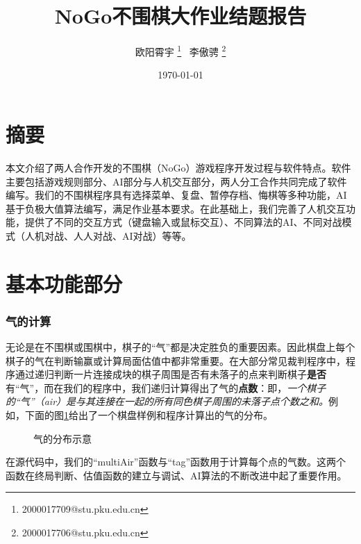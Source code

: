 \documentclass[twocolumn]{article}
\title{\bf NoGo不围棋大作业结题报告}
\author{欧阳霄宇 \thanks{2000017709@stu.pku.edu.cn} \ 李傲骋 \thanks{2000017706@stu.pku.edu.cn}}
\date{\today}
\begin{document}
\maketitle{}
\tableofcontents
\newpage
\part{摘要}
本文介绍了两人合作开发的不围棋（NoGo）游戏程序开发过程与软件特点。软件主要包括游戏规则部分、AI部分与人机交互部分，两人分工合作共同完成了软件编写。我们的不围棋程序具有选择菜单、复盘、暂停存档、悔棋等多种功能，AI基于负极大值算法编写，满足作业基本要求。在此基础上，我们完善了人机交互功能，提供了不同的交互方式（键盘输入或鼠标交互）、不同算法的AI、不同对战模式（人机对战、人人对战、AI对战）等等。
\part{基本功能部分}
\section{气的计算}
无论是在不围棋或围棋中，棋子的“气”都是决定胜负的重要因素。因此棋盘上每个棋子的气在判断输赢或计算局面估值中都非常重要。在大部分常见裁判程序中，程序通过递归判断一片连接成块的棋子周围是否有未落子的点来判断棋子{\bf 是否}有“气”，而在我们的程序中，我们递归计算得出了气的{\bf 点数}：即，{\it 一个棋子的“气”（air）是与其连接在一起的所有同色棋子周围的未落子点个数之和。}例如，下面的图\ref{Fig.main}给出了一个棋盘样例和程序计算出的气的分布。
\begin{figure}[H]
\centering  %
\caption{气的分布示意}
\label{Fig.main}
\end{figure}
\par
在源代码中，我们的“multiAir”函数与“tag”函数用于计算每个点的气数。这两个函数在终局判断、估值函数的建立与调试、AI算法的不断改进中起了重要作用。
\end{document}

